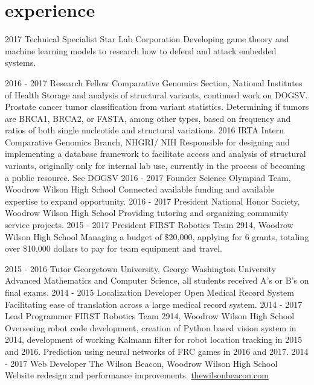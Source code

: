 \documentclass[]{friggeri-cv}
\begin{document}
\section{experience}

\begin{entrylist}
  \entry
    {2017}
    {Technical Specialist}
    {Star Lab Corporation}
    {Developing game theory and machine learning models to research how to defend and attack embedded systems.}
    
  \entry
    {2016  - 2017}
    {Research Fellow}
    {Comparative Genomics Section, National Institutes of Health}
    {Storage and analysis of structural variants, continued work on DOGSV. Prostate cancer tumor classification from variant statistics. Determining if tumors are BRCA1, BRCA2, or FASTA, among other types, based on frequency and ratios of both single nucleotide and structural variations. }
  \entry
    {2016}
    {IRTA Intern}
    {Comparative Genomics Branch, NHGRI/ NIH}
    {Responsible for designing and implementing a database framework to facilitate access and analysis of structural variants, originally only for internal lab use, currently in the process of becoming a public resource. See DOGSV}
  \entry
    {2016 - 2017}
    {Founder}
    {Science Olympiad Team, Woodrow Wilson High School}
    {Connected available funding and available expertise to expand opportunity.}
  \entry
    {2016 - 2017}
    {President}
    {National Honor Society, Woodrow Wilson High School}
    {Providing tutoring and organizing community service projects.}
  \entry
    {2015 - 2017}
    {President}
    {FIRST Robotics Team 2914, Woodrow Wilson High School}
    {Managing a budget of \$20,000, applying for 6 grants, totaling over \$10,000 dollars to pay for team equipment and travel.}


\end{entrylist}

\begin{entrylist}
  \entry
    {2015 - 2016}
    {Tutor}
    {Georgetown University, George Washington University}
    {Advanced Mathematics and Computer Science, all students received A's or B's on final exams.}
  \entry
    {2014 - 2015}
    {Localization Developer}
    {Open Medical Record System}
    {Facilitating ease of translation across a large medical record system.}
  \entry
    {2014 - 2017}
    {Lead Programmer}
    {FIRST Robotics Team 2914, Woodrow Wilson High School}
    {Overseeing robot code development, creation of Python based vision system in 2014, development of working Kalmann filter for robot location tracking in 2015 and 2016. Prediction using neural networks of FRC games in 2016 and 2017.}
  \entry
    {2014 - 2017}
    {Web Developer}
    {The Wilson Beacon, Woodrow Wilson High School}
    {Website redesign and performance improvements. \href{http://thewilsonbeacon.com}{thewilsonbeacon.com}}
\end{entrylist}
\end{document}
